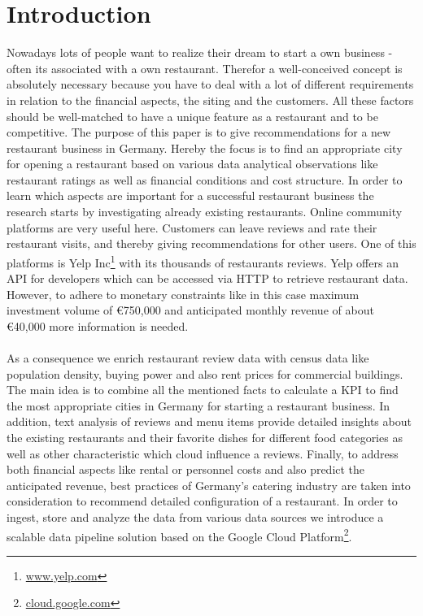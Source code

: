\section{Introduction}
\label{sec:introduction}
Nowadays lots of people want to realize their dream to start a own business - often its associated with a own restaurant. Therefor a well-conceived concept is absolutely necessary because you have to deal with a lot of different requirements in relation to the financial aspects, the siting and the customers. All these factors should be well-matched to have a unique feature as a restaurant and to be competitive. \newline
The purpose of this paper is to give recommendations for a new restaurant business in Germany. Hereby the focus is to find an appropriate city for opening a restaurant based on various data analytical observations like restaurant ratings as well as financial conditions and cost structure.
In order to learn which aspects are important for a successful restaurant business the research starts by investigating already existing restaurants. Online community platforms are very useful here. Customers can leave reviews and rate their restaurant visits, and thereby giving recommendations for other users. One of this platforms is Yelp Inc\footnote{\href{https://www.yelp.com/}{www.yelp.com}} with its thousands of restaurants reviews. Yelp offers an \ac{API} for developers which can be accessed via HTTP to retrieve restaurant data. However, to adhere to monetary constraints like in this case maximum investment volume of \euro{750,000} and anticipated monthly revenue of about \euro{40,000} more information is needed.\\
\\
As a consequence we enrich restaurant review data with census data like population density, buying power and also rent prices for commercial buildings. The main idea is to combine all the mentioned facts to calculate a \ac{KPI} to find the most appropriate cities in Germany for starting a restaurant business. In addition, text analysis of reviews and menu items provide detailed insights about the existing restaurants and their favorite dishes for different food categories as well as other characteristic which cloud influence a reviews. Finally, to address both financial aspects like rental or personnel costs and also predict the anticipated revenue, best practices of Germany's catering industry are taken into consideration to recommend detailed configuration of a restaurant. In order to ingest, store and analyze the data from various data sources we introduce a scalable data pipeline solution based on the Google Cloud Platform\footnote{\href{https://cloud.google.com/}{cloud.google.com}}.

